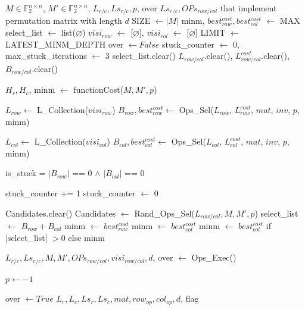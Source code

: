 \begin{algorithm}[htbp]
\caption{Parallel Greedy}
\label{alg:parallel-greedy}
\footnotesize
\begin{algorithmic}[1]
\Require $M \in \mathbb{F}_{2}^{n \times n}$, $M' \in \mathbb{F}_{2}^{n \times n}$, $L_{r/c}, Ls_{r/c}, p$, over
\Ensure $Ls_{r/c}, OPs_{row/col}$ that implement permutation matrix with length $d$
\State SIZE $\leftarrow |M|$
\State minm, $best_{row}^{cost}, best_{col}^{cost}$ $\leftarrow$ MAX
\State select\_list $\leftarrow$ list($\varnothing$)
\State $visi_{row}$ $\leftarrow$ [$\varnothing$], $visi_{col}$ $\leftarrow$ [$\varnothing$]
\State LIMIT $\leftarrow$ LATEST\_MINM\_DEPTH
\State over $\leftarrow False$ 
\State stuck\_counter $\leftarrow$ 0, max\_stuck\_iterations $\leftarrow$ 3
	\State select\_list.clear()
	\State $L_{row/col}$.clear(), $L_{row/col}^{cost}$.clear(), $B_{row/col}$.clear()
	
	\State $H_{r}, H_{c}$, minm $\leftarrow$ functionCost($M, M', p$)
    
		\State $L_{row} \leftarrow$ L\_Collection($visi_{row}$)
		\State $B_{row}, best_{row}^{cost} \leftarrow$ Ops\_Sel($L_{row}$, $L_{row}^{cost}$, $mat$, $inv$, $p$, minm) 
    \EndIf
    
	\State $L_{col} \leftarrow$ L\_Collection($visi_{col}$)
	\State $B_{col}, best_{col}^{cost} \leftarrow$ Ops\_Sel($L_{col}$, $L_{col}^{cost}$, $mat$, $inv$, $p$, minm)
	
	\State is\_stuck = $|B_{row}|$ == 0 $\land$ $|B_{col}|$ == 0
	
		\State stuck\_counter += 1
	\Else
		\State stuck\_counter $\leftarrow$ 0
    \EndIf
    
	    \State Candidates.clear()
		\State Candidates $\leftarrow$ Rand\_Ops\_Sel($L_{row/col}, M, M', p$)
	\Else
		\State select\_list $\leftarrow$ $B_{row} + B_{col}$
			\State minm $\leftarrow$ $best_{row}^{cost}$
			\State minm $\leftarrow$ $best_{col}^{cost}$
		\Else
			\State minm $\leftarrow$ $best_{col}^{cost}$ if |select\_list| $> 0$ else minm
    	\EndIf
	\EndIf
    
	\State $L_{r/c}, Ls_{r/c}, M, M', OPs_{row/col}, visi_{row/col}, d$, over $\leftarrow$ Ops\_Exec()
	
		\State $p \leftarrow -1$
	\EndIf
    
	    \State over $\leftarrow True$
	    \State \Return
    \EndIf
\EndWhile
\State \Return $L_{r}, L_{c}, Ls_{r}, Ls_{c}, mat, row_{op}, col_{op}, d$, flag
\end{algorithmic}
\end{algorithm}


